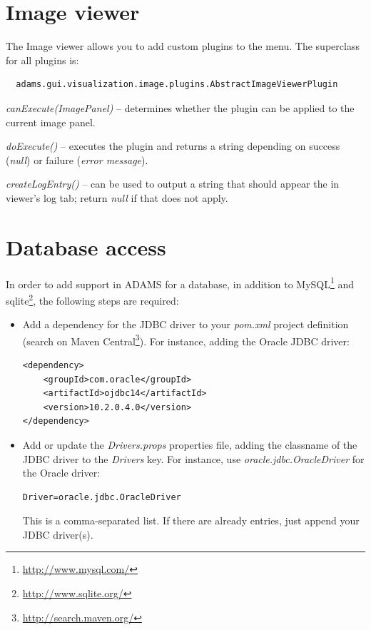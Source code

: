 \section{Image viewer}
The Image viewer allows you to add custom plugins to the menu. The superclass
for all plugins is:
\begin{verbatim}
  adams.gui.visualization.image.plugins.AbstractImageViewerPlugin
\end{verbatim}
\begin{tight_itemize}
  \item \textit{canExecute(ImagePanel)} -- determines whether the plugin can
  be applied to the current image panel.
  \item \textit{doExecute()} -- executes the plugin and returns a string
  depending on success (\textit{null}) or failure (\textit{error message}).
  \item \textit{createLogEntry()} -- can be used to output a string that 
  should appear the in viewer's log tab; return \textit{null} if that does
  not apply.
\end{tight_itemize}

\section{Database access}
In order to add support in ADAMS for a database, in addition to MySQL\footnote{\url{http://www.mysql.com/}{}} 
and sqlite\footnote{\url{http://www.sqlite.org/}{}}, the following steps
are required:
\begin{itemize}
	\item Add a dependency for the JDBC driver to your \textit{pom.xml} project
	definition (search on Maven Central\footnote{\url{http://search.maven.org/}{}}). 
	For instance, adding the Oracle JDBC driver: \\
\begin{verbatim}
<dependency>
    <groupId>com.oracle</groupId>
    <artifactId>ojdbc14</artifactId>
    <version>10.2.0.4.0</version>
</dependency>
\end{verbatim}
	\item Add or update the \textit{Drivers.props} properties file, adding
	the classname of the JDBC driver to the \textit{Drivers} key. For instance,
	use \textit{oracle.jdbc.OracleDriver} for the Oracle driver: \\
\begin{verbatim}
Driver=oracle.jdbc.OracleDriver
\end{verbatim}
	This is a comma-separated list. If there are already entries, just append
	your JDBC driver(s).
\end{itemize}

